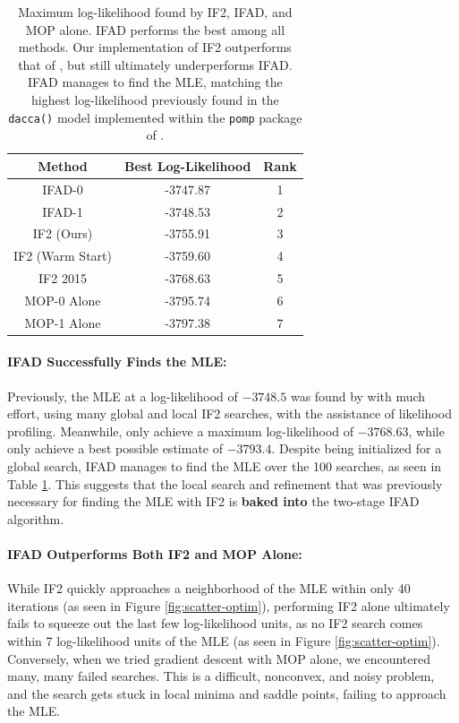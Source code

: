\documentclass[9pt,twocolumn,twoside]{pnas-new}
\begin{document}

\begin{table}[h!]
\centering
\begin{tabular}{||c c c||} 
 \hline
 Method & Best Log-Likelihood & Rank \\ [0.5ex] 
 \hline\hline
     IFAD-0 & -3747.87 & 1\\
     IFAD-1 & -3748.53 & 2\\
     IF2 (Ours) & -3755.91 & 3\\
     IF2 (Warm Start) & -3759.60 & 4 \\
     IF2 2015 & -3768.63 & 5\\ 
     MOP-0 Alone & -3795.74 & 6\\
     MOP-1 Alone & -3797.38 & 7\\
 \hline
\end{tabular}
\caption{Maximum log-likelihood found by IF2, IFAD, and MOP alone. IFAD performs the best among all methods. Our implementation of IF2 outperforms that of \cite{ionides15}, but still ultimately underperforms IFAD. IFAD manages to find the MLE, matching the highest log-likelihood previously found in the \texttt{dacca()} model implemented within the \texttt{pomp} package of \cite{king16}.}
\label{table:mle}
\end{table}

\paragraph{IFAD Successfully Finds the MLE:} Previously, the MLE at a log-likelihood of $-3748.5$ was found by \cite{king16} with much effort, using many global and local IF2 searches, with the assistance of likelihood profiling. Meanwhile, \cite{ionides15} only achieve a maximum log-likelihood of $-3768.63$, while \cite{king08} only achieve a best possible estimate of $-3793.4$. Despite being initialized for a global search, IFAD manages to find the MLE over the 100 searches, as seen in Table \ref{table:mle}. This suggests that the local search and refinement that was previously necessary for finding the MLE with IF2 is \textbf{baked into} the two-stage IFAD algorithm. 


\paragraph{IFAD Outperforms Both IF2 and MOP Alone:} While IF2 quickly approaches a neighborhood of the MLE within only 40 iterations (as seen in Figure \ref{fig:scatter-optim}), performing IF2 alone ultimately fails to squeeze out the last few log-likelihood units, as no IF2 search comes within 7 log-likelihood units of the MLE (as seen in Figure \ref{fig:scatter-optim}). Conversely, when we tried gradient descent with MOP alone, we encountered many, many failed searches. This is a difficult, nonconvex, and noisy problem, and the search gets stuck in local minima and saddle points, failing to approach the MLE. 
\end{document}
